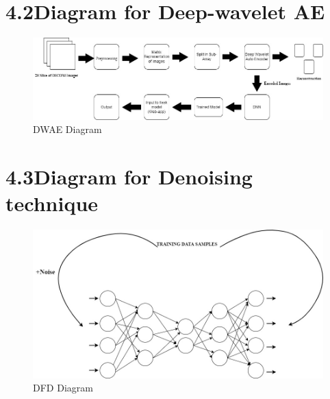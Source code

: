 \documentclass[oneside,a4paper,12pt]{book}
\begin{document}
\section*{4.2\hspace*{10pt}Diagram  for Deep-wavelet AE}
\begin{Center}
\begin{figure}[H]
	\begin{Center}
		\includegraphics[width=1.0\linewidth]{Deep_wavelet_AE.jpg}
		\caption{DWAE Diagram}
		\label{fig:EndorsersCommitters_Role}
	\end{Center}
\end{figure}
\end{Center}\par


\section*{4.3\hspace*{10pt}Diagram for Denoising  technique}
\begin{Center}
\begin{figure}[H]
	\begin{Center}
		\includegraphics[width=\linewidth]{Denoising_AE.jpg}
		\caption{DFD Diagram}
		\label{fig:EndorsersCommitters_Role}
	\end{Center}
\end{figure}
\end{Center}\par
\end{document}
